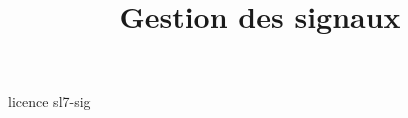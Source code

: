 \documentclass [xcolor=table] {beamer}
\title {Gestion des signaux}
\begin{document}
 {licence}
 {sl7-sig}
\end{document}
